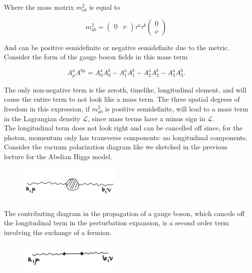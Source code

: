 \noindent Where the mass matrix $m_{ab}^2$ is equal to

\begin{equation}
m_{ab}^2 = \begin{pmatrix} \underline{0} & \nu \end{pmatrix} \tau^a \tau^b \begin{pmatrix} \underline{0} \\ \nu \end{pmatrix}
\end{equation}

\noindent And can be positive semidefinite or negative semidefinite due to the metric. Consider the form of the gauge boson fields in this mass term

\begin{equation}
A_\mu^a A^{b \mu} = A^a_0 A^b_0 - A_1^a A_1^b - A_2^a A_2^b - A_3^a A_3^b   .
\end{equation}

\noindent The only non-negative term is the zeroth, timelike, longitudinal element, and will cause the entire term to not look like a mass term. The three spatial degrees of freedom in this expression, if $m^2_{ab}$ is positive semidefinite, will lead to a mass term in the Lagrangian density $\mathcal{L}$, since mass terms have a minus sign in $\mathcal{L}$. \\

\noindent The longitudinal term does not look right and can be cancelled off since, for the photon, momentum only has transverse components: no longitudinal components. Consider the vacuum polarization diagram like we sketched in the previous lecture for the Abelian Higgs model.

\begin{figure}[H]
	\centering
	\includegraphics[width=2in]{images/gauge_boson_poles.png}
\end{figure} 

\noindent The contributing diagram in the propagation of a gauge boson, which cancels off the longitudinal term in the perturbation expansion, is a second order term involving the exchange of a fermion.

\begin{figure}[H]
	\centering
	\includegraphics[width=2in]{images/gauge_boson_cancel.png}
\end{figure} 

